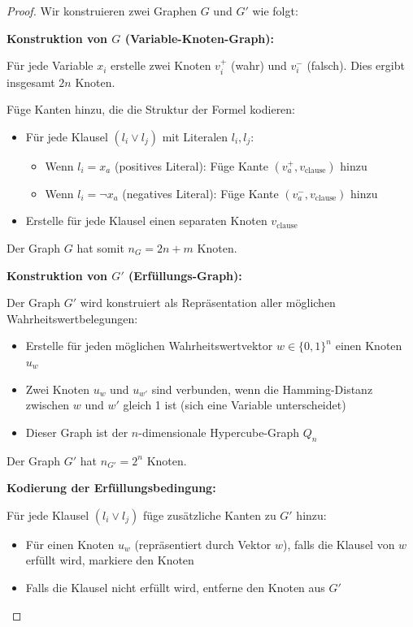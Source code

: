 ﻿\documentclass[a4paper,12pt]{article}
\theoremstyle{definition}
\begin{document}
\begin{proof}
	Wir konstruieren zwei Graphen $G$ und $G'$ wie folgt:
	
	\textbf{Konstruktion von $G$ (Variable-Knoten-Graph):}
	
	Für jede Variable $x_i$ erstelle zwei Knoten $v_i^+$ (wahr) und $v_i^-$ (falsch). Dies ergibt insgesamt $2n$ Knoten.
	
	Füge Kanten hinzu, die die Struktur der Formel kodieren:
	\begin{itemize}
		\item Für jede Klausel $(l_i \lor l_j)$ mit Literalen $l_i, l_j$:
		\begin{itemize}
			\item Wenn $l_i = x_a$ (positives Literal): Füge Kante $(v_a^+, v_{\text{clause}})$ hinzu
			\item Wenn $l_i = \neg x_a$ (negatives Literal): Füge Kante $(v_a^-, v_{\text{clause}})$ hinzu
		\end{itemize}
		\item Erstelle für jede Klausel einen separaten Knoten $v_{\text{clause}}$
	\end{itemize}
	
	Der Graph $G$ hat somit $n_G = 2n + m$ Knoten.
	
	\textbf{Konstruktion von $G'$ (Erfüllungs-Graph):}
	
	Der Graph $G'$ wird konstruiert als Repräsentation aller möglichen Wahrheitswertbelegungen:
	\begin{itemize}
		\item Erstelle für jeden möglichen Wahrheitswertvektor $w \in \{0,1\}^n$ einen Knoten $u_w$
		\item Zwei Knoten $u_w$ und $u_{w'}$ sind verbunden, wenn die Hamming-Distanz zwischen $w$ und $w'$ gleich 1 ist (sich eine Variable unterscheidet)
		\item Dieser Graph ist der $n$-dimensionale Hypercube-Graph $Q_n$
	\end{itemize}
	
	Der Graph $G'$ hat $n_{G'} = 2^n$ Knoten.
	
	\textbf{Kodierung der Erfüllungsbedingung:}
	
	Für jede Klausel $(l_i \lor l_j)$ füge zusätzliche Kanten zu $G'$ hinzu:
	\begin{itemize}
		\item Für einen Knoten $u_w$ (repräsentiert durch Vektor $w$), falls die Klausel von $w$ erfüllt wird, markiere den Knoten
		\item Falls die Klausel nicht erfüllt wird, entferne den Knoten aus $G'$
	\end{itemize}
	

\end{proof}
\end{document}
